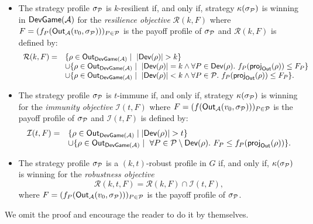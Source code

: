 \begin{itemize}

\item   The strategy profile \(\sigma_{\mathcal{P}}\) is \(k\)-resilient if, and only
  if, strategy \(\kappa(\sigma_{\mathcal{P}})\) is winning in \(\textsf{DevGame}(\mathcal{A})\) for the
  \emph{resilience objective} \(\mathcal{R}(k,F)\) where
  \(F = (f_P(\textsf{Out}_{\mathcal{A}}(v_0, \sigma_{\mathcal{P}})))_{P \in \mathcal{P}}\) is the payoff profile of
  \(\sigma_{\mathcal{P}}\) and \(\mathcal{R}(k,F)\) is defined by:
  \[
    \begin{array}{ll}
      \mathcal{R}(k,F) = & \{ \rho \in \Out_{\devg(\mathcal{A})}\mid ~ |\Dev(\rho)| > k \} \\
                          &\cup
                            \{ \rho  \in \Out_{\devg(\mathcal{A})} \mid ~ |\Dev(\rho)| = k \land \forall P \in \Dev(\rho).\ \payoff_{P}(\proj_{\Out}(\rho)) \le F_P\} \\
                          & \cup \{ \rho  \in \Out_{\devg(\mathcal{A})}\mid ~ |\Dev(\rho)| < k \land \forall P \in \Agt.\ \payoff_{P}(\proj_{\Out}(\rho)) \le F_P\}.
    \end{array}
  \]

\item   The strategy profile \(\sigma_{\mathcal{P}}\) is \(t\)-immune if, and only if,
  strategy \(\kappa(\sigma_{\mathcal{P}})\) is winning for the \emph{immunity
  objective} \(\mathcal{I}(t,F)\) where
  \(F = (f(\textsf{Out}_{\mathcal{A}}(v_0, \sigma_{\mathcal{P}})))_{P \in \mathcal{P}}\) is the payoff profile of
  \(\sigma_{\mathcal{P}}\) and \(\mathcal{I}(t,F)\) is defined by:
  \[
    \begin{array}{ll}
    \mathcal{I}(t,F) = & \{ \rho  \in \textsf{Out}_{\textsf{DevGame}(\mathcal{A})} \mid |\textsf{Dev}(\rho)| > t \}  \\
      & \cup \{ \rho  \in \textsf{Out}_{\textsf{DevGame}(\mathcal{A})} \mid ~ \forall P \in \mathcal{P} \setminus \textsf{Dev}(\rho).\  F_P \le f_{P}(\textsf{proj}_{\textsf{Out}}(\rho)) \}.
    \end{array}
  \]
\item   The strategy profile \(\sigma_{\mathcal{P}}\) is a \((k,t)\)-robust profile in
  \(G\) if, and only if, \(\kappa(\sigma_{\mathcal{P}})\) is winning for the
  \emph{robustness objective}
  \[
        \mathcal{R}(k,t,F)= \mathcal{R}(k,F) \cap \mathcal{I}(t,F),
        \] where
        \(F = (f_P(\textsf{Out}_{\mathcal{A}}(v_0, \sigma_{\mathcal{P}})))_{P \in \mathcal{P}}\) is the payoff profile of
        \(\sigma_{\mathcal{P}}\).
\end{itemize}

We omit the proof and encourage the reader to do it by themselves.


